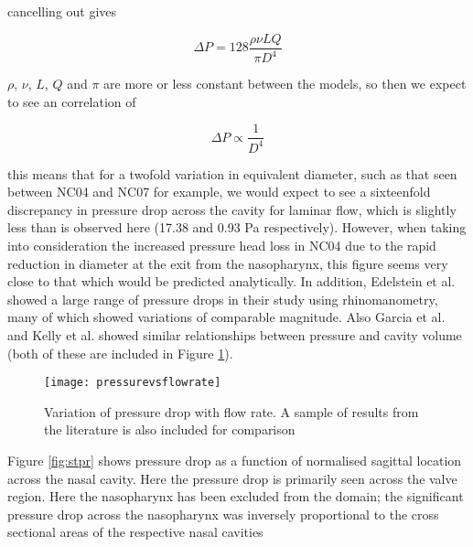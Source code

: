cancelling out gives

\begin{equation}
  \Delta P = 128 \frac{\rho \nu L Q}{\pi D^4}
\end{equation}

$\rho$, $\nu$, $L$, $Q$ and $\pi$ are more or less constant between the models, so then we expect to see an correlation of

\begin{equation} \label{corollation}
  \Delta P \propto \frac{1}{D^4}
\end{equation}

this means that for a twofold variation in equivalent diameter, such as that seen between NC04 and NC07 for example, we would expect to see a sixteenfold discrepancy in pressure drop across the cavity for laminar flow, which is slightly less than is observed here (17.38 and 0.93 Pa respectively). However, when taking into consideration the increased pressure head loss in NC04 due to the rapid reduction in diameter at the exit from the nasopharynx, this figure seems very close to that which would be predicted analytically.
In addition, Edelstein et al. \cite{Edelstein1996} showed a large range of pressure drops in their study using rhinomanometry, many of which showed variations of comparable magnitude. Also Garcia et al. \cite{Garcia2007} and Kelly et al. \cite{Kelly2004} showed similar relationships between pressure and cavity volume (both of these are included in Figure \ref{tab:pvv}).

  \begin{figure} 
    \texttt{[image: pressurevsflowrate]}
      \caption{Variation of pressure drop with flow rate. A sample of results from the literature is also included for comparison}
  \label{tab:pvv}
\end{figure}

%

Figure \ref{fig:stpr} shows pressure drop as a function of normalised sagittal location across the nasal cavity. Here the pressure drop is primarily seen across the valve region. Here the nasopharynx has been excluded from the domain; the significant pressure drop across the nasopharynx was inversely proportional to the cross sectional areas of the respective nasal cavities


